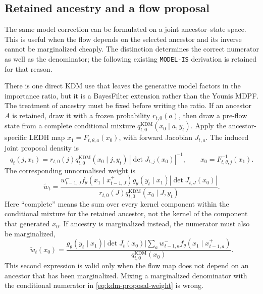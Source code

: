 \documentclass[11pt]{article}
\newcommand{\KDM}{\ensuremath{\mathrm{KDM}}}
\begin{document}
\subsection{Retained ancestry and a flow proposal}

The same model correction can be formulated on a joint ancestor--state
space. This is useful when the flow depends on the selected ancestor and
its inverse cannot be marginalized cheaply. The distinction determines the
correct numerator as well as the denominator; the following existing
\texttt{MODEL-IS} derivation is retained for that reason.


There is one direct KDM use that leaves the generative model factors in the
importance ratio, but it is a BayesFilter extension rather than the Younis
MDPF.  The treatment of ancestry must be fixed before writing the ratio.  If
an ancestor $A$ is retained, draw it with a frozen probability $r_{t,0}(a)$,
then draw a pre-flow state from a complete conditional mixture
$q^{\KDM}_{t,0}(x_0\mid a,y_t)$.  Apply the ancestor-specific LEDH map
$x_1=F_{t,\theta,a}(x_0)$, with forward Jacobian $J_{t,a}$.  The induced joint
proposal density is
\begin{equation}
 q_t(j,x_1)
 = r_{t,0}(j)q^{\KDM}_{t,0}(x_0\mid j,y_t)
   \,|\det J_{t,j}(x_0)|^{-1},
 \qquad x_0=F_{t,\theta,j}^{-1}(x_1).
 \label{eq:kdm-proposal-density}
\end{equation}
The corresponding unnormalised weight is
\begin{equation}
 \widetilde w_t
 = \frac{w^-_{t-1,J}
     f_\theta(x_1\mid x^+_{t-1,J})
     g_\theta(y_t\mid x_1)
     |\det J_{t,J}(x_0)|}
    {r_{t,0}(J)q^{\KDM}_{t,0}(x_0\mid J,y_t)}.
 \label{eq:kdm-proposal-weight}
\end{equation}
Here ``complete'' means the sum over every kernel component within the
conditional mixture for the retained ancestor, not the kernel of the component
that generated $x_0$.  If ancestry is marginalized instead, the numerator must
also be marginalized,
\begin{equation}
 \widetilde w_t(x_0)
 =\frac{g_\theta(y_t\mid x_1)|\det J_t(x_0)|
   \sum_a w^-_{t-1,a}f_\theta(x_1\mid x^+_{t-1,a})}
  {q^{\KDM}_{t,0}(x_0)}.
 \label{eq:kdm-proposal-marginal-weight}
\end{equation}
This second expression is valid only when the flow map does not depend on an
ancestor that has been marginalized.  Mixing a marginalized denominator with
the conditional numerator in \eqref{eq:kdm-proposal-weight} is wrong.
\end{document}
